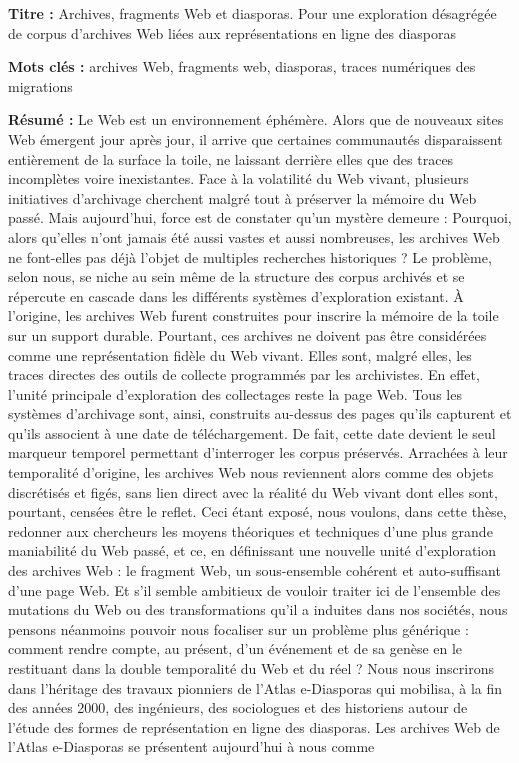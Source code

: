 \documentclass[symmetric,justified,marginals=raggedouter]{tufte-book}
\newcommand{\blankpage}{\newpage\hbox{}\thispagestyle{empty}\newpage}
\begin{document}
\blankpage

  
\newpage
\begin{fullwidth}
\thispagestyle{empty}
\setlength{\parskip}{\baselineskip}

\noindent\textbf{Titre :} Archives, fragments Web et diasporas. Pour une exploration désagrégée de corpus d'archives Web liées aux représentations en ligne des diasporas 

\noindent\textbf{Mots clés :} archives Web, fragments web, diasporas, traces numériques des migrations 

\noindent\textbf{Résumé :} Le Web est un environnement éphémère. Alors que de nouveaux sites Web émergent jour après jour, il arrive que certaines communautés disparaissent entièrement de la surface la toile, ne laissant derrière elles que des traces incomplètes voire inexistantes. Face à la volatilité du Web vivant, plusieurs initiatives d'archivage cherchent malgré tout à préserver la mémoire du Web passé. Mais aujourd'hui, force est de constater qu'un mystère demeure : Pourquoi, alors qu'elles n'ont jamais été aussi vastes et aussi nombreuses, les archives Web ne font-elles pas déjà l'objet de multiples recherches historiques ? Le problème, selon nous, se niche au sein même de la structure des corpus archivés et se répercute en cascade dans les différents systèmes d'exploration existant. À l'origine, les archives Web furent construites pour inscrire la mémoire de la toile sur un support durable. Pourtant, ces archives ne doivent pas être considérées comme une représentation fidèle du Web vivant. Elles sont, malgré elles, les traces directes des outils de collecte programmés par les archivistes. En effet, l'unité principale d'exploration des collectages reste la page Web. Tous les systèmes d'archivage sont, ainsi, construits au-dessus des pages qu'ils capturent et qu'ils associent à une date de téléchargement. De fait, cette date devient le seul marqueur temporel permettant d'interroger les corpus préservés. Arrachées à leur temporalité d'origine, les archives Web nous reviennent alors comme des objets discrétisés et figés, sans lien direct avec la réalité du Web vivant dont elles sont, pourtant, censées être le reflet. Ceci étant exposé, nous voulons, dans cette thèse, redonner aux chercheurs les moyens théoriques et techniques d'une plus grande maniabilité du Web passé, et ce, en définissant une nouvelle unité d'exploration des archives Web : le fragment Web, un sous-ensemble cohérent et auto-suffisant d'une page Web. Et s'il semble ambitieux de vouloir traiter ici de l'ensemble des mutations du Web ou des transformations qu'il a induites dans nos sociétés, nous pensons néanmoins pouvoir nous focaliser sur un problème plus générique : comment rendre compte, au présent, d'un événement et de sa genèse en le restituant dans la double temporalité du Web et du réel ? Nous nous inscrirons dans l'héritage des travaux pionniers de l'Atlas e-Diasporas qui mobilisa, à la fin des années 2000, des ingénieurs, des sociologues et des historiens autour de l'étude des formes de représentation en ligne des diasporas. Les archives Web de l'Atlas e-Diasporas se présentent aujourd'hui à nous comme 
\end{fullwidth}
\end{document}
